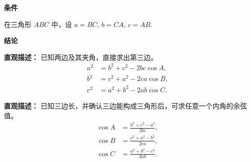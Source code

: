 \begin{statementbox}
	\textbf{\textcolor{CStatement}{条件}}
	\begin{description}[style=nextline, leftmargin=2.8em, labelsep=0.5em, itemsep=0.35em]
		\item[\textbf{\textcolor{CStatement}{条件 1（三角形边角）：}}] 在三角形 $ABC$ 中，设 $a = BC$, $b = CA$, $c = AB$.
	\end{description}

	\textbf{\textcolor{CStatement}{结论}}
	\begin{description}[style=nextline, leftmargin=2.8em, labelsep=0.5em, itemsep=0.45em]
		\item[\textbf{\textcolor{CStatement}{结论一（两边夹角求边）：}}]
		      \textbf{\textcolor{CStatement}{直观描述：}} 已知两边及其夹角，直接求出第三边。
		      \[
			      \begin{aligned}
				      a^2 & = b^2 + c^2 - 2bc\cos A, \\
				      b^2 & = c^2 + a^2 - 2ca\cos B, \\
				      c^2 & = a^2 + b^2 - 2ab\cos C.
			      \end{aligned}
		      \]

		\item[\textbf{\textcolor{CStatement}{推广结论（三边求角）：}}]
		      \textbf{\textcolor{CStatement}{直观描述：}} 已知三边长，并确认三边能构成三角形后，可求任意一个内角的余弦值。
		      \[
			      \begin{aligned}
				      \cos A & = \frac{b^2 + c^2 - a^2}{2bc}, \\
				      \cos B & = \frac{c^2 + a^2 - b^2}{2ca}, \\
				      \cos C & = \frac{a^2 + b^2 - c^2}{2ab}.
			      \end{aligned}
		      \]
	\end{description}
\end{statementbox}